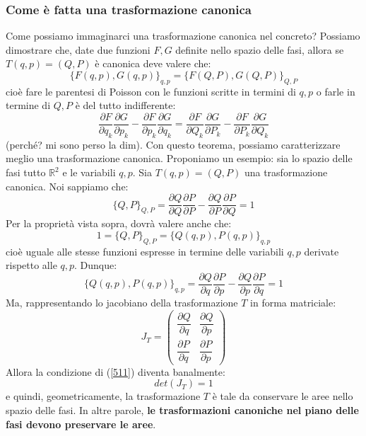 \documentclass[a4paper,openany]{article}
\begin{document}
\subsubsection{Come è fatta una trasformazione canonica}
Come possiamo immaginarci una trasformazione canonica nel concreto? Possiamo dimostrare che, date due funzioni $F,G$ definite nello spazio delle fasi, allora se $T(q,p)=(Q,P)$ è canonica deve valere che:
$$
\{F(q,p),G(q,p)\}_{q,p} = \{F(Q,P),G(Q,P)\}_{Q,P}
$$
cioè fare le parentesi di Poisson con le funzioni scritte in termini di $q,p$ o farle in termine di $Q,P$ è del tutto indifferente:
\begin{equation}\label{key}
	\dfrac{\partial F}{\partial q_k}\dfrac{\partial G}{\partial p_k}-\dfrac{\partial F}{\partial p_k}\dfrac{\partial G}{\partial q_k} = \dfrac{\partial F}{\partial Q_k}\dfrac{\partial G}{\partial P_k}-\dfrac{\partial F}{\partial P_k}\dfrac{\partial G}{\partial Q_k}
\end{equation}
(perché? mi sono perso la dim). Con questo teorema, possiamo caratterizzare meglio una trasformazione canonica. Proponiamo un esempio: sia lo spazio delle fasi tutto $\mathbb{R}^2$ e le variabili $q,p$. Sia $T(q,p)=(Q,P)$ una trasformazione canonica. Noi sappiamo che:
$$
\{Q,P\}_{Q,P} = \dfrac{\partial Q}{\partial Q}\dfrac{\partial P}{\partial P} - \dfrac{\partial Q}{\partial P}\dfrac{\partial P}{\partial Q} = 1
$$
Per la proprietà vista sopra, dovrà valere anche che:
$$
1 = \{Q,P\}_{Q,P} = \{Q(q,p),P(q,p)\}_{q,p}
$$
cioè uguale alle stesse funzioni espresse in termine delle variabili $q,p$ derivate rispetto alle $q,p$. Dunque:
\begin{equation}
	\{Q(q,p),P(q,p)\}_{q,p} = \dfrac{\partial Q}{\partial q}\dfrac{\partial P}{\partial p}-\dfrac{\partial Q}{\partial p}\dfrac{\partial P}{\partial q}=1
	\label{511}
\end{equation}
Ma, rappresentando lo jacobiano della trasformazione $T$ in forma matriciale:
\begin{equation}\label{key}
	J_{T} =
	\begin{pmatrix}
		\dfrac{\partial Q}{\partial q} & \dfrac{\partial Q}{\partial p} \\
		\dfrac{\partial P}{\partial q} &
		\dfrac{\partial P}{\partial p}
	\end{pmatrix}
\end{equation}
Allora la condizione di (\ref{511}) diventa banalmente:
\begin{equation}\label{key}
	det(J_{T})=1
\end{equation}
e quindi, geometricamente, la trasformazione $T$ è tale da conservare le aree nello spazio delle fasi. In altre parole, \textbf{le trasformazioni canoniche nel piano delle fasi devono preservare le aree}.
\end{document}
